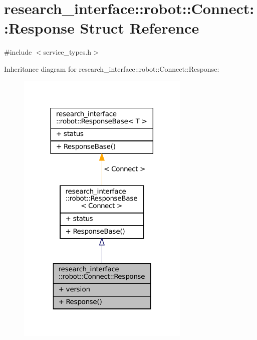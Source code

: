 \hypertarget{structresearch__interface_1_1robot_1_1Connect_1_1Response}{}\section{research\+\_\+interface\+:\+:robot\+:\+:Connect\+:\+:Response Struct Reference}
\label{structresearch__interface_1_1robot_1_1Connect_1_1Response}


{\ttfamily \#include $<$service\+\_\+types.\+h$>$}



Inheritance diagram for research\+\_\+interface\+:\+:robot\+:\+:Connect\+:\+:Response\+:
\nopagebreak
\begin{figure}[H]
\begin{center}
\leavevmode
\includegraphics[width=233pt]{structresearch__interface_1_1robot_1_1Connect_1_1Response__inherit__graph}
\end{center}
\end{figure}


